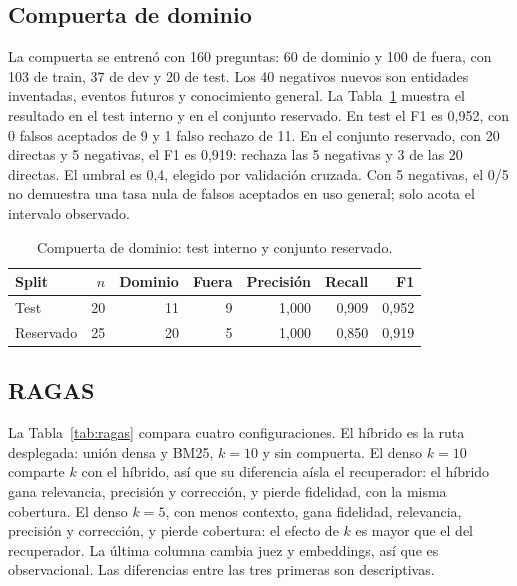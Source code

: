 \subsection{Compuerta de dominio}

La compuerta se entren\'o con 160 preguntas: 60 de dominio y 100 de fuera, con 103 de train, 37 de dev y 20 de test. Los 40 negativos nuevos son entidades inventadas, eventos futuros y conocimiento general. La Tabla~\ref{tab:compuerta} muestra el resultado en el test interno y en el conjunto reservado. En test el F1 es 0,952, con 0 falsos aceptados de 9 y 1 falso rechazo de 11. En el conjunto reservado, con 20 directas y 5 negativas, el F1 es 0,919: rechaza las 5 negativas y 3 de las 20 directas. El umbral es 0,4, elegido por validaci\'on cruzada. Con 5 negativas, el 0/5 no demuestra una tasa nula de falsos aceptados en uso general; solo acota el intervalo observado.

\begin{table}[t]
\centering
\footnotesize
\caption{Compuerta de dominio: test interno y conjunto reservado.}
\label{tab:compuerta}
\begin{tabular}{lrrrrrr}
\toprule
Split & $n$ & Dominio & Fuera & Precisi\'on & Recall & F1 \\
\midrule
Test & 20 & 11 & 9 & 1,000 & 0,909 & 0,952 \\
Reservado & 25 & 20 & 5 & 1,000 & 0,850 & 0,919 \\
\bottomrule
\end{tabular}
\end{table}

\subsection{RAGAS}

La Tabla~\ref{tab:ragas} compara cuatro configuraciones. El h\'ibrido es la ruta desplegada: uni\'on densa y BM25, $k=10$ y sin compuerta. El denso $k=10$ comparte $k$ con el h\'ibrido, as\'i que su diferencia a\'isla el recuperador: el h\'ibrido gana relevancia, precisi\'on y correcci\'on, y pierde fidelidad, con la misma cobertura. El denso $k=5$, con menos contexto, gana fidelidad, relevancia, precisi\'on y correcci\'on, y pierde cobertura: el efecto de $k$ es mayor que el del recuperador. La \'ultima columna cambia juez y embeddings, as\'i que es observacional. Las diferencias entre las tres primeras son descriptivas.


